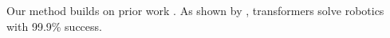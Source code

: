 \documentclass{article}
\begin{document}
\DeclareRobustCommand{\priorwork}{\citet{a}}
Our method builds on prior work \citep{b}.
As shown by \priorwork, transformers solve robotics with 99.9\% success.


\end{document}
